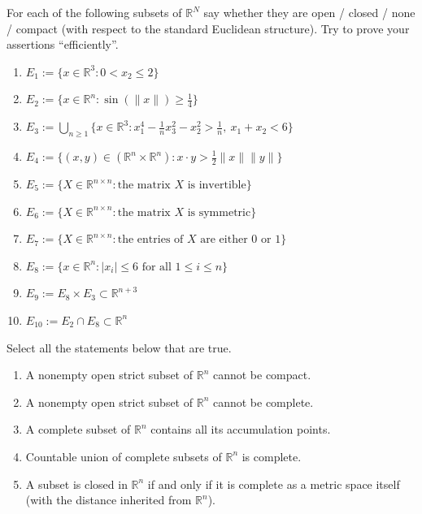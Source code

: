 \begin{exercise}
\label{ex:3.3}
For each of the following subsets of $\mathbb{R}^N$ say whether they are open / closed / none /
compact (with respect to the standard Euclidean structure). Try to prove your assertions
``efficiently''.
\begin{enumerate}[label=\textbf{\arabic*.}]
  \item $E_1 := \{x \in \mathbb{R}^3 : 0 < x_2 \leq 2\}$
  \item $E_2 := \{x \in \mathbb{R}^n : \sin(\|x\|) \geq \tfrac{1}{4}\}$
  \item $E_3 := \bigcup_{n \geq 1}\{x \in \mathbb{R}^3 : x_1^4 - \tfrac{1}{n}x_3^2 - x_2^2 > \tfrac{1}{n},\ x_1 + x_2 < 6\}$
  \item $E_4 := \{(x,y) \in (\mathbb{R}^n \times \mathbb{R}^n) : x \cdot y > \tfrac{1}{2}\|x\|\|y\|\}$
  \item $E_5 := \{X \in \mathbb{R}^{n\times n} : \text{the matrix } X \text{ is invertible}\}$
  \item $E_6 := \{X \in \mathbb{R}^{n\times n} : \text{the matrix } X \text{ is symmetric}\}$
  \item $E_7 := \{X \in \mathbb{R}^{n\times n} : \text{the entries of } X \text{ are either } 0 \text{ or } 1\}$
  \item $E_8 := \{x \in \mathbb{R}^n : |x_i| \leq 6 \text{ for all } 1 \leq i \leq n\}$
  \item $E_9 := E_8 \times E_3 \subset \mathbb{R}^{n+3}$
  \item $E_{10} := E_2 \cap E_8 \subset \mathbb{R}^n$
\end{enumerate}
\end{exercise}

\begin{exercise}
\label{ex:3.4}
Select all the statements below that are true.
\begin{enumerate}[label=\textbf{(\alph*)}]
  \item A nonempty open strict subset of $\mathbb{R}^n$ cannot be compact.
  \item A nonempty open strict subset of $\mathbb{R}^n$ cannot be complete.
  \item A complete subset of $\mathbb{R}^n$ contains all its accumulation points.
  \item Countable union of complete subsets of $\mathbb{R}^n$ is complete.
  \item A subset is closed in $\mathbb{R}^n$ if and only if it is complete as a metric space
    itself (with the distance inherited from $\mathbb{R}^n$).
\end{enumerate}
\end{exercise}

